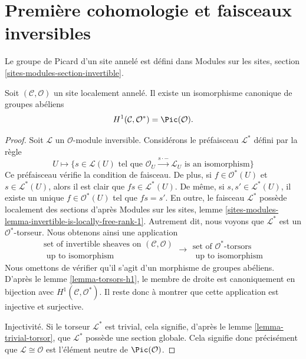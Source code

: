 \section{Première cohomologie et faisceaux inversibles}
\label{section-invertible-sheaves}

\noindent
Le groupe de Picard d'un site annelé est défini dans
Modules sur les sites, section \ref{sites-modules-section-invertible}.

\begin{lemma}
\label{lemma-h1-invertible}
Soit $(\mathcal{C}, \mathcal{O})$ un site localement annelé.
Il existe un isomorphisme canonique de groupes abéliens
$$
H^1(\mathcal{C}, \mathcal{O}^*) = \Pic(\mathcal{O}).
$$

\end{lemma}

\begin{proof}
Soit $\mathcal{L}$ un $\mathcal{O}$-module inversible.
Considérons le préfaisceau $\mathcal{L}^*$ défini par la règle
$$
U \longmapsto \{s \in \mathcal{L}(U)
\text{ tel que } \mathcal{O}_U \xrightarrow{s \cdot -} \mathcal{L}_U
\text{ is an isomorphism}\}
$$
Ce préfaisceau vérifie la condition de faisceau. De plus, si
$f \in \mathcal{O}^*(U)$ et $s \in \mathcal{L}^*(U)$, alors il est clair que
$fs \in \mathcal{L}^*(U)$. De même, si $s, s' \in \mathcal{L}^*(U)$,
il existe un unique $f \in \mathcal{O}^*(U)$ tel que
$fs = s'$. En outre, le faisceau $\mathcal{L}^*$ possède localement des sections
d'après Modules sur les sites, lemme
\ref{sites-modules-lemma-invertible-is-locally-free-rank-1}.
Autrement dit, nous
voyons que $\mathcal{L}^*$ est un $\mathcal{O}^*$-torseur. Nous obtenons ainsi
une application
$$
\begin{matrix}
\text{set of invertible sheaves on }(\mathcal{C}, \mathcal{O}) \\
\text{ up to isomorphism}
\end{matrix}
\longrightarrow
\begin{matrix}
\text{set of }\mathcal{O}^*\text{-torsors} \\
\text{ up to isomorphism}
\end{matrix}
$$
Nous omettons de vérifier qu'il s'agit d'un morphisme de groupes abéliens.
D'après le
lemme \ref{lemma-torsors-h1},
le membre de droite est canoniquement
en bijection avec $H^1(\mathcal{C}, \mathcal{O}^*)$.
Il reste donc à montrer que cette application est injective et surjective.

\medskip\noindent
Injectivité. Si le torseur $\mathcal{L}^*$ est trivial, cela signifie, d'après le
lemme \ref{lemma-trivial-torsor},
que $\mathcal{L}^*$ possède une section globale.
Cela signifie donc précisément que $\mathcal{L} \cong \mathcal{O}$ est
l'élément neutre de $\Pic(\mathcal{O})$.


\end{proof}
